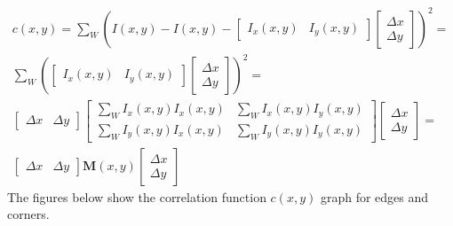 \documentclass[a4paper]{article}
\begin{document}
\begin{gather*}
  c(x,y)  = \sum\limits_{W}\left( I(x,y) - I(x,y) - \begin{bmatrix}I_x(x,y) & I_y(x,y) \end{bmatrix}\begin{bmatrix}\Delta x \\ \Delta y \end{bmatrix} \right)^2   = \\
  \sum\limits_{W}\left( \begin{bmatrix}I_x(x,y) & I_y(x,y) \end{bmatrix}\begin{bmatrix}\Delta x \\ \Delta y \end{bmatrix} \right)^2 = \\
  \begin{bmatrix}\Delta x & \Delta y \end{bmatrix}
  \begin{bmatrix}
  \sum\limits_{W}I_x(x,y)I_x(x,y) & \sum\limits_{W}I_x(x,y)I_y(x,y) \\
  \sum\limits_{W}I_y(x,y)I_x(x,y) & \sum\limits_{W}I_y(x,y)I_y(x,y)
  \end{bmatrix}
  \begin{bmatrix}\Delta x \\ \Delta y \end{bmatrix} = \\
  \begin{bmatrix}\Delta x & \Delta y \end{bmatrix} \textbf{M}(x,y) \begin{bmatrix}\Delta x \\ \Delta y \end{bmatrix}
  \tag{3}
\end{gather*}
The figures below show the correlation function $c(x,y)$ graph for edges and corners.
\end{document}
